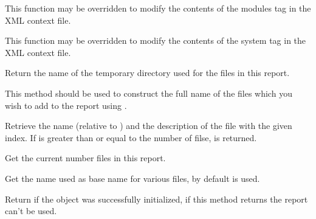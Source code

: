 \label{wxdebugreportdoaddloadedmodules}


This function may be overridden to modify the contents of the modules tag in
the XML context file.


\label{wxdebugreportdoaddsysteminfo}


This function may be overridden to modify the contents of the system tag in
the XML context file.


\label{wxdebugreportgetdirectory}


Return the name of the temporary directory used for the files in this report.

This method should be used to construct the full name of the files which you
wish to add to the report using .


\label{wxdebugreportgetfile}


Retrieve the name (relative to 
) and the description of the
file with the given index. If  is greater than or equal to the number of
filse, \false is returned.


\label{wxdebugreportgetfilescount}


Get the current number files in this report.


\label{wxdebugreportgetreportname}


Get the name used as base name for various files, by default 
 is used.


\label{wxdebugreportisok}


Return \true if the object was successfully initialized, if this method returns 
\false the report can't be used.


